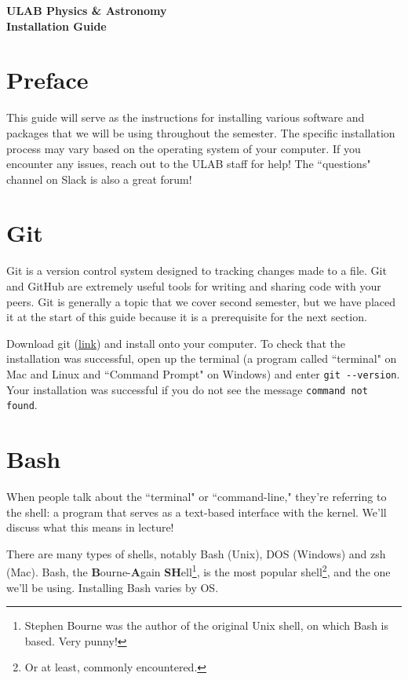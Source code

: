 \documentclass[12pt]{article}
\numberwithin{equation}{section}
\begin{document}
	\begin{center}
			\textbf{\Large{ULAB Physics \& Astronomy\\Installation Guide}}
	\end{center}

	\tableofcontents

	\section{Preface}
	
	This guide will serve as the instructions for installing various software and packages that we will be using throughout the semester. The specific installation process may vary based on the operating system of your computer. If you encounter any issues, reach out to the ULAB staff for help! The ``questions" channel on Slack is also a great forum!
	
	\section{Git}
	
	Git is a version control system designed to tracking changes made to a file. Git and GitHub are extremely useful tools for writing and sharing code with your peers. Git is generally a topic that we cover second semester, but we have placed it at the start of this guide because it is a prerequisite for the next section.
	
	Download git (\hyperref{https://git-scm.com/downloads}{}{}{link}) and install onto your computer. To check that the installation was successful, open up the terminal (a program called ``terminal" on Mac and Linux and ``Command Prompt" on Windows) and enter \verb|git --version|. Your installation was successful if you do not see the message \verb|command not found|.
	
	\section{Bash}
	
	When people talk about the ``terminal" or ``command-line," they're referring to the shell: a program that serves as a text-based interface with the kernel. We'll discuss what this means in lecture! 
	
	There are many types of shells, notably Bash (Unix), DOS (Windows) and zsh (Mac). Bash, the \textbf{B}ourne-\textbf{A}gain \textbf{SH}ell\footnote{Stephen Bourne was the author of the original Unix shell, on which Bash is based. Very punny!}, is the most popular shell\footnote{Or at least, commonly encountered.}, and the one we'll be using. Installing Bash varies by OS.
	
\end{document}
